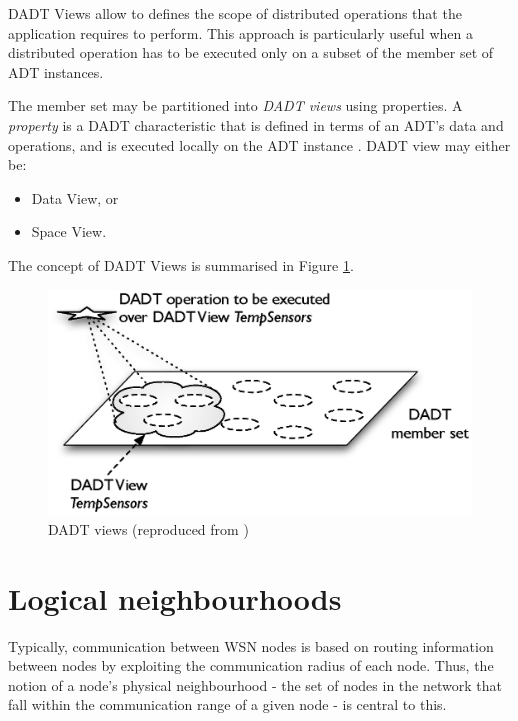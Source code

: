 DADT Views allow to defines the scope of distributed operations
that the application requires to perform. This approach is particularly useful
when a distributed operation has to be executed only on a subset of the
member set of ADT instances.

The member set may be partitioned into \emph{DADT views} using properties. A
\emph{property} is a DADT characteristic that is defined in terms of an ADT's
data and operations, and is executed locally on the ADT instance
\cite{migliavacca_DADT:2006}.
DADT view may either be:
\begin{itemize}
  \item Data View, or
  \item Space View.
\end{itemize}

The concept of DADT Views is summarised in Figure \ref{Fig:DADT_Views}.

\begin{figure}
\centering
\includegraphics[scale=0.71]{img/DADT_Views.eps} 
\caption[DADT views]{DADT views (reproduced from \cite{migliavacca_DADT:2006})}
\label{Fig:DADT_Views}
\end{figure}

\section {Logical neighbourhoods} \label{LNDescription}

Typically, communication between WSN nodes is based on routing 
information between nodes by exploiting the communication radius of each node.
Thus, the notion of a node's physical neighbourhood - the set of nodes in the
network that fall within the communication range of a given node - is central to this.

